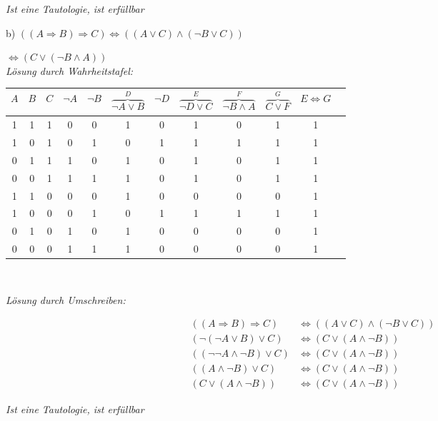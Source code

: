 \textit{Ist eine Tautologie, ist erfüllbar}\\

\newpage

b) $((A \Rightarrow B) \Rightarrow C) \Leftrightarrow ((A \lor C) \land (\lnot B \lor C))$

\hspace{3.57cm}$\Leftrightarrow (C \lor (\lnot B \land A))$\\

\textit{Lösung durch Wahrheitstafel:}

\begin{table}[h]
\centering
\begin{tabular}{c|c|c|c|c|c|c|c|c|c|c|c}
$A$ & $B$ & $C$ & $\lnot A$ & $\lnot B$ & $\overbrace{\lnot A \lor B}^{D}$ & $\lnot D$ & $\overbrace{\lnot D \lor C}^{E}$ & $\overbrace{\lnot B \land A}^{F}$ & $\overbrace{C \lor F}^{G}$ & $E \Leftrightarrow G$\\
\hline
1 & 1 & 1 & 0 & 0 & 1 & 0 & 1 & 0 & 1 & 1\\
1 & 0 & 1 & 0 & 1 & 0 & 1 & 1 & 1 & 1 & 1\\
0 & 1 & 1 & 1 & 0 & 1 & 0 & 1 & 0 & 1 & 1\\
0 & 0 & 1 & 1 & 1 & 1 & 0 & 1 & 0 & 1 & 1\\
1 & 1 & 0 & 0 & 0 & 1 & 0 & 0 & 0 & 0 & 1\\
1 & 0 & 0 & 0 & 1 & 0 & 1 & 1 & 1 & 1 & 1\\
0 & 1 & 0 & 1 & 0 & 1 & 0 & 0 & 0 & 0 & 1\\
0 & 0 & 0 & 1 & 1 & 1 & 0 & 0 & 0 & 0 & 1\\
\end{tabular}
\end{table}\

\textit{Lösung durch Umschreiben:}

\begin{align*}
((A \Rightarrow B) \Rightarrow C) &\Leftrightarrow ((A \lor C) \land (\lnot B \lor C))\\
(\lnot (\lnot A \lor B) \lor C) &\Leftrightarrow (C \lor (A \land \lnot B))\\
((\lnot \lnot A \land \lnot B) \lor C) &\Leftrightarrow (C \lor (A \land \lnot B))\\
((A \land \lnot B) \lor C) &\Leftrightarrow (C \lor (A \land \lnot B))\\
(C \lor (A \land \lnot B)) &\Leftrightarrow (C \lor (A \land \lnot B))
\end{align*}

\textit{Ist eine Tautologie, ist erfüllbar}\\

